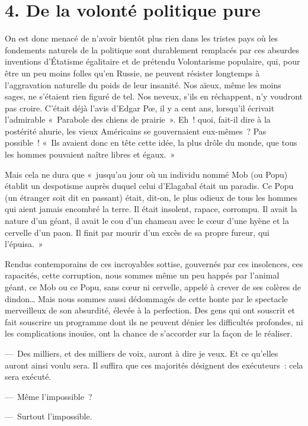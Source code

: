 \documentclass[french,twoside]{book} %
\begin{document}
\section[{4. De la volonté politique pure}]{4. De la volonté politique pure}
\noindent On est donc menacé de n’avoir bientôt plus rien dans les tristes pays où les fondements naturels de la politique sont durablement remplacés par ces absurdes inventions d’Étatisme égalitaire et de prétendu Volontarisme populaire, qui, pour être un peu moins folles qu’en Russie, ne peuvent résister longtemps à l’aggravation naturelle du poids de leur insanité. Nos aïeux, même les moins sages, ne s’étaient rien figuré de tel. Nos neveux, s’ils en réchappent, n’y voudront pas croire. C’était déjà l’avis d’Edgar Pœ, il y a cent ans, lorsqu’il écrivait l’admirable « Parabole des chiens de prairie ». Eh ! quoi, fait-il dire à la postérité ahurie, les vieux Américains se gouvernaient eux-mêmes ? Pas possible ! « Ils avaient donc en tête cette idée, la plus drôle du monde, que tous les hommes pouvaient naître libres et égaux. »\par
Mais cela ne dura que « jusqu’au jour où un individu nommé Mob (ou Popu) établit un despotisme auprès duquel celui d’Elagabal était un paradis. Ce Popu (un étranger soit dit en passant) était, dit-on, le plus odieux de tous les hommes qui aient jamais encombré la terre. Il était insolent, rapace, corrompu. Il avait la nature d’un géant, il avait le cou d’un chameau avec le cœur d’une hyène et la cervelle d’un paon. Il finit par mourir d’un excès de sa propre fureur, qui l’épuisa. »\par
Rendus contemporains de ces incroyables sottise, gouvernés par ces insolences, ces rapacités, cette corruption, nous sommes même un peu happés par l’animal géant, ce Mob ou ce Popu, sans cœur ni cervelle, appelé à crever de ses colères de dindon… Mais nous sommes aussi dédommagés de cette honte par le spectacle merveilleux de son absurdité, élevée à la perfection. Des gens qui ont souscrit et fait souscrire un programme dont ils ne peuvent dénier les difficultés profondes, ni les complications inouïes, ont la chance de s’accorder sur la façon de le réaliser.\par
— Des milliers, et des milliers de voix, auront à dire je veux. Et ce qu’elles auront ainsi voulu sera. Il suffira que ces majorités désignent des exécuteurs : cela sera exécuté.\par
— Même l’impossible ?\par
— Surtout l’impossible.\par
\end{document}
